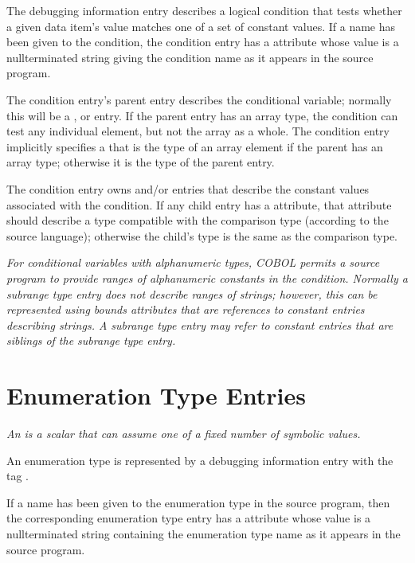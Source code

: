 The \DWTAGconditionTARG{}
debugging information entry
describes a
logical condition that tests whether a given data item\textquoteright s
value matches one of a set of constant values. If a name
has been given to the condition, the condition entry has a
\DWATname{} attribute
whose value is a null\dash terminated string
giving the condition name as it appears in the source program.

The condition entry's parent entry describes the conditional
variable; normally this will be a \DWTAGvariable,
\DWTAGmember{} or 
\DWTAGformalparameter{} entry.
If 
the parent
entry has an array type, the condition can test any individual
element, but not the array as a whole. The condition entry
implicitly specifies a  that is the
type of an array element if the parent has an array type;
otherwise it is the type of the parent entry.

The condition entry owns \DWTAGconstant{} and/or
\DWTAGsubrangetype{} entries that describe the constant
values associated with the condition. If any child entry 
has
a \DWATtype{} attribute,
that attribute should describe a type
compatible with the comparison type (according to the source
language); otherwise the child\textquoteright s type is the same as the
comparison type.

\textit{For conditional variables with alphanumeric types, COBOL
permits a source program to provide ranges of alphanumeric
constants in the condition. Normally a subrange type entry
does not describe ranges of strings; however, this can be
represented using bounds attributes that are references to
constant entries describing strings. A subrange type entry may
refer to constant entries that are siblings of the subrange
type entry.}


\section{Enumeration Type Entries}
\label{chap:enumerationtypeentries}

\textit{An  is a scalar that can assume one of
a fixed number of symbolic values.}

An enumeration type is represented by a debugging information
entry with the tag 
\DWTAGenumerationtypeTARG.

If a name has been given to the enumeration type in the source
program, then the corresponding enumeration type entry has
a \DWATname{} attribute
whose value is a null\dash terminated
string containing the enumeration type name as it appears
in the source program. 

